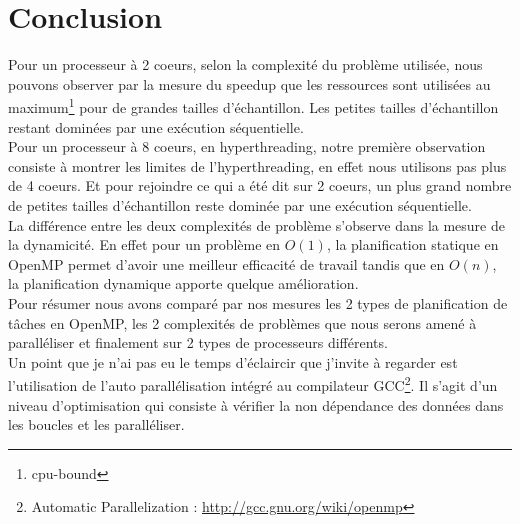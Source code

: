 \section{Conclusion}

Pour un processeur à 2 coeurs, selon la complexité du problème utilisée, nous pouvons observer par la mesure du speedup que les ressources sont utilisées au maximum\footnote{cpu-bound} pour de grandes tailles d'échantillon. Les petites tailles d'échantillon restant dominées par une exécution séquentielle.\\

Pour un processeur à 8 coeurs, en hyperthreading, notre première observation consiste à montrer les limites de l'hyperthreading, en effet nous utilisons pas plus de 4 coeurs. Et pour rejoindre ce qui a été dit sur 2 coeurs, un plus grand nombre de petites tailles d'échantillon reste dominée par une exécution séquentielle.\\

La différence entre les deux complexités de problème s'observe dans la mesure de la dynamicité. En effet pour un problème en $O(1)$, la planification statique en OpenMP permet d'avoir une meilleur efficacité de travail tandis que en $O(n)$, la planification dynamique apporte quelque amélioration.\\

Pour résumer nous avons comparé par nos mesures les 2 types de planification de tâches en OpenMP, les 2 complexités de problèmes que nous serons amené à paralléliser et finalement sur 2 types de processeurs différents.\\

Un point que je n'ai pas eu le temps d'éclaircir que j'invite à regarder est l'utilisation de l'auto parallélisation intégré au compilateur GCC\footnote{Automatic Parallelization : \url{http://gcc.gnu.org/wiki/openmp}}. Il s'agit d'un niveau d'optimisation qui consiste à vérifier la non dépendance des données dans les boucles et les paralléliser.
